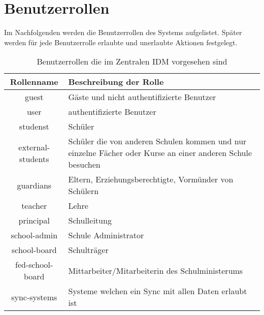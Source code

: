 \section{Benutzerrollen}
Im Nachfolgenden werden die Benutzerrollen des Systems aufgelistet. 
Später werden für jede Benutzerrolle erlaubte und unerlaubte Aktionen festgelegt.


\begin{table}[htb]
	\begin{tabularx}{\textwidth}{|c|X|}
		\hline
\textbf{Rollenname} & \textbf{Beschreibung der Rolle} \\ \hline
guest & Gäste und nicht authentifizierte Benutzer \\ \hline
user & authentifizierte Benutzer \\ \hline
studenst & Schüler \\ \hline
external-students & Schüler die von anderen Schulen kommen und nur einzelne Fächer oder Kurse an einer anderen Schule besuchen \\ \hline
guardians & Eltern, Erziehungsberechtigte, Vormünder von Schülern \\ \hline
teacher & Lehre \\ \hline
principal & Schulleitung \\ \hline
school-admin & Schule Administrator \\ \hline
school-board & Schulträger \\ \hline
fed-school-board & Mittarbeiter/Mitarbeiterin des Schulministerums \\ \hline
sync-systems & Systeme welchen ein Sync mit allen Daten erlaubt ist \\ \hline

	\end{tabularx}

		\caption{Benutzerrollen die im Zentralen IDM vorgesehen sind}
		\label{tab:intro:roles}
\end{table}